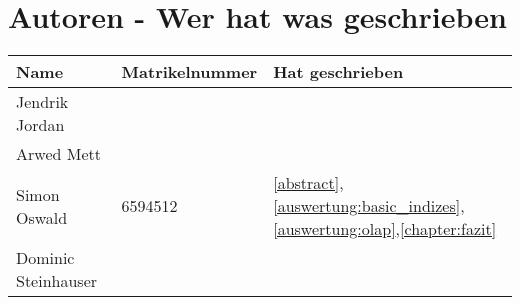 \chapter{Autoren - Wer hat was geschrieben}
\begin{table}[H]
    \centering
    \begin{tabularx}{\textwidth}{llX}
    \toprule
	Name                &	Matrikelnummer  & Hat geschrieben \\
    \toprule
    Jendrik Jordan      &                   & \\
    Arwed Mett          &                   & \\
    Simon Oswald        &   6594512         & \autoref{abstract},\autoref{auswertung:basic_indizes},\autoref{auswertung:olap},\autoref{chapter:fazit} \\
    Dominic Steinhauser &                   & \\
    \bottomrule
    \end{tabularx}
    \label{tab:autoren}
\end{table}